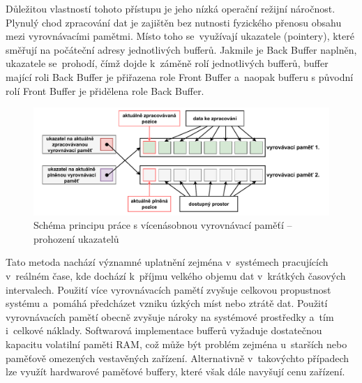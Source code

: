 Důležitou vlastností tohoto přístupu je jeho nízká operační režijní náročnost. Plynulý chod zpracování dat je zajištěn bez nutnosti fyzického přenosu obsahu mezi vyrovnávacími pamětmi. Místo toho se~využívají ukazatele (pointery), které směřují na počáteční adresy jednotlivých bufferů. Jakmile je Back Buffer naplněn, ukazatele se~prohodí, čímž dojde k~záměně rolí jednotlivých bufferů, buffer mající roli Back Buffer je přiřazena role Front Buffer a~naopak bufferu s původní rolí Front Buffer je přidělena role Back Buffer.

\begin{figure}[h]
    \centering
    \includegraphics[width=1.00\textwidth]{obrazky-figures/multiple_buffering-2.pdf}
    
    \caption{Schéma principu práce s vícenásobnou vyrovnávací paměťí -- prohození ukazatelů}
    \label{fig:multiple-buffering-2}
\end{figure}

\newpage

Tato metoda nachází významné uplatnění zejména v~systémech pracujících v~reálném čase, kde dochází k~příjmu velkého objemu dat v~krátkých časových intervalech. Použití více vyrovnávacích pamětí zvyšuje celkovou propustnost systému a~pomáhá předcházet vzniku úzkých míst nebo ztrátě dat. Použití vyrovnávacích pamětí obecně zvyšuje nároky na systémové prostředky a~tím i~celkové náklady. Softwarová implementace bufferů vyžaduje dostatečnou kapacitu volatilní paměti RAM, což může být problém zejména u~starších nebo paměťově omezených vestavěných zařízení. Alternativně v~takovýchto případech lze využít hardwarové paměťové buffery, které však dále navyšují cenu zařízení.~\cite{buffering_chang}

